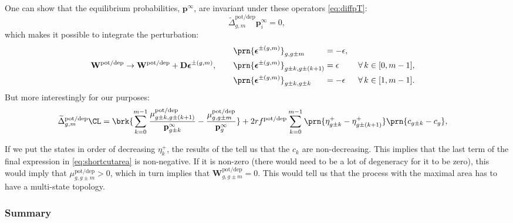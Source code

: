 \documentclass{article} %
\newcommand{\pr}{\mathbf{p}}
\newcommand{\eq}{\pr^\infty}
\newcommand{\D}{\mathbf{D}}
\newcommand{\w}{\mathbf{w}}
\newcommand{\W}{\mathbf{W}}
\newcommand{\potdep}{^{\text{pot/dep}}}
\begin{document}
One can show that the equilibrium probabilities, $\eq$, are invariant under these operators \eqref{eq:diffpT}:
%
\begin{equation}\label{eq:shortcutprob}
  \widetilde{\Delta}\potdep _{g,m} \eq_i = 0,
\end{equation}
%
which makes it possible to integrate the perturbation:
%
\begin{equation}\label{eq:shortcutfinite}
  \W\potdep  \to \W\potdep  + \D\boldsymbol{\epsilon}^{\pm(g,m)},
  \qquad
  \begin{aligned}
    &\prn{\boldsymbol{\epsilon}^{\pm(g,m)}}_{g,g\pm m}
      &\!\!\!\!\!\!&= -\epsilon,\\
    &\prn{\boldsymbol{\epsilon}^{\pm(g,m)}}_{g\pm k,g\pm(k+1)}
      &\!\!\!\!\!\!&= \epsilon
        &\;
        &\forall\, k \in [0,m-1],\\
    &\prn{\boldsymbol{\epsilon}^{\pm(g,m)}}_{g\pm k,g\pm k}
      &\!\!\!\!\!\!&= -\epsilon
        &
        &\forall\, k \in [1,m-1].
  \end{aligned}
\end{equation}
%
But more interestingly for our purposes:
%
\begin{align}
\label{eq:shortcutarea}
    \widetilde{\Delta}\potdep _{g,m}\CL &=
      \brk{ \sum_{k=0}^{m-1} \frac{\mu\potdep _{g\pm k,g\pm(k+1)}}{\eq_{g\pm k}}
      - \frac{\mu\potdep _{g,g\pm m}}{\eq_g}}
      + 2rf\potdep  \sum_{k=0}^{m-1} \prn{\eta^+_{g\pm k} - \eta^+_{g\pm(k+1)}} \prn{c_{g\pm k} - c_{g}},
\end{align}
%

If we put the states in order of decreasing $\eta^+_k$, the results of the  tell us that the $c_k$ are non-decreasing.
This implies that the last term of the final expression in \eqref{eq:shortcutarea} is non-negative.
If it is non-zero (there would need to be a lot of degeneracy for it to be zero), this would imply that $\mu\potdep _{g,g\pm m}>0$, which in turn implies that $\W\potdep _{g,g\pm m}=0$.
This would tell us that the process with the maximal area has to have a multi-state topology.


\subsubsection{Summary}\label{sec:KTsummary}
\end{document}
